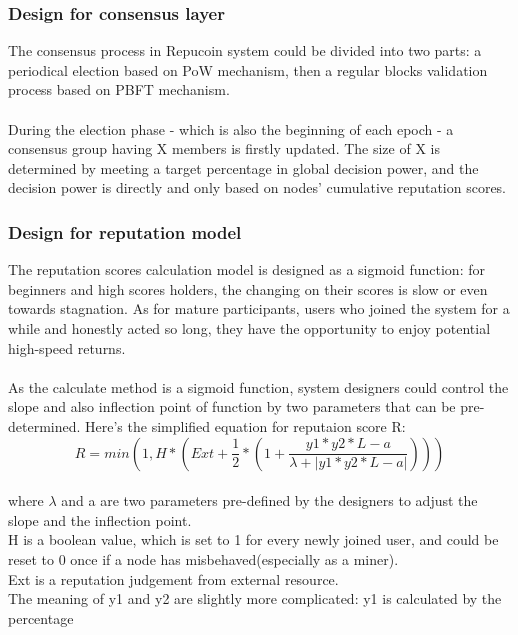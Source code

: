 \documentclass[]{article}
\begin{document}
\begin{CJK*}{UTF8}{gbsn}
	\subsubsection*{Design for consensus layer}
	The consensus process in Repucoin system could be divided into two parts: a periodical election based on PoW mechanism, then a regular blocks validation process based on PBFT mechanism.
	\paragraph{}
	During the election phase - which is also the beginning of each epoch - a consensus group having X members is firstly updated. The size of X is determined by meeting a target percentage in global decision power, and the decision power is directly and only based on nodes' cumulative reputation scores.
	\subsubsection*{Design for reputation model}
	The reputation scores calculation model is designed as a sigmoid function: for beginners and high scores holders, the changing on their scores is slow or even towards stagnation. As for mature participants, users who joined the system for a while and honestly acted so long, they have the opportunity to enjoy potential high-speed returns.
	\paragraph{}
	As the calculate method is a sigmoid function, system designers could control the slope and also inflection point of function by two parameters that can be pre-determined. Here's the simplified equation for reputaion score R:
	\begin{equation}
	R = min(1, H * (Ext + \frac{1}{2}*(1+\frac{y1*y2*L-a}{\lambda+|y1*y2*L-a|}) ))
	\end{equation}
\\where $\lambda$ and a are two parameters pre-defined by the designers to adjust the slope and the inflection point.	
\\H is a boolean value, which is set to 1 for every newly joined user, and could be reset to 0 once if a node has misbehaved(especially as a miner).
\\Ext is a reputation judgement from external resource. 
\\The meaning of y1 and y2 are slightly more complicated: y1 is calculated by the percentage 
	

\end{CJK*}
\end{document}
